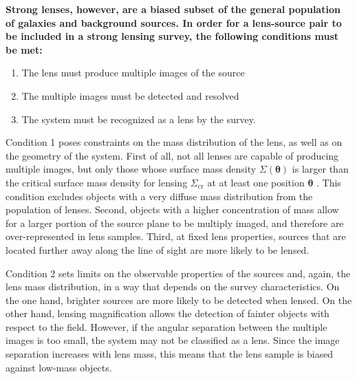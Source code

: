 \documentclass{aa}
\begin{document}
{\bf
Strong lenses, however, are a biased subset of the general population of galaxies and background sources.
In order for a lens-source pair to be included in a strong lensing survey, the following conditions must be met:
\begin{enumerate}
\item The lens must produce multiple images of the source
\item The multiple images must be detected and resolved
\item The system must be recognized as a lens by the survey.
\end{enumerate}
Condition 1 poses constraints on the mass distribution of the lens, as well as on the geometry of the system. 
First of all, not all lenses are capable of producing multiple images, but only those whose surface mass density $\Sigma(\boldsymbol\theta)$ is larger than the critical surface mass density for lensing $\Sigma_{\mathrm{cr}}$ at at least one position $\boldsymbol\theta$ \citep{SEF92}.
This condition excludes objects with a very diffuse mass distribution from the population of lenses.
Second, objects with a higher concentration of mass allow for a larger portion of the source plane to be multiply imaged, and therefore are over-represented in lens samples. Third, at fixed lens properties, sources that are located further away along the line of sight are more likely to be lensed.


Condition 2 sets limits on the observable properties of the sources and, again, the lens mass distribution, in a way that depends on the survey characteristics.
On the one hand, brighter sources are more likely to be detected when lensed. On the other hand, lensing magnification allows the detection of fainter objects with respect to the field.
However, if the angular separation between the multiple images is too small, the system may not be classified as a lens.
Since the image separation increases with lens mass, this means that the lens sample is biased against low-mass objects.

}
\end{document}
